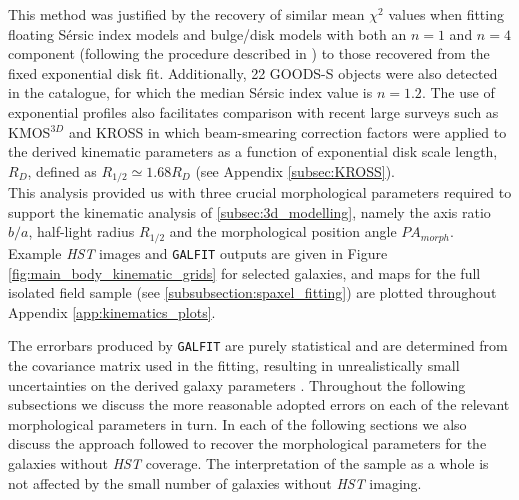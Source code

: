 \documentclass[fleqn,usenatbib]{mnras}
\newcommand{\Sers}{S\'{e}rsic }
\begin{document}
This method was justified by the recovery of similar mean $\chi^{2}$ values when fitting floating \Sers index models and bulge/disk models with both an $n=1$ and $n=4$ component (following the procedure described in \citealt{Bruce2012}) to those recovered from the fixed exponential disk fit.
Additionally, 22 GOODS-S objects were also detected in the \cite{VanderWel2012} catalogue, for which the median \Sers index value is $n=1.2$.
The use of exponential profiles also facilitates comparison with recent large surveys such as KMOS$^{3D}$ \citep{Wisnioski2015} and KROSS \citep{Harrison2017} in which beam-smearing correction factors were applied to the derived kinematic parameters as a function of exponential disk scale length, $R_{D}$, defined as $R_{1/2}\simeq1.68 R_{D}$ (see Appendix \ref{subsec:KROSS}). \\

\noindent
This analysis provided us with three crucial morphological parameters required to support the kinematic analysis of \cref{subsec:3d_modelling}, namely the axis ratio $b/a$, half-light radius $R_{1/2}$ and the morphological position angle $PA_{morph}$.
Example {\em HST} images and {\tt GALFIT} outputs are given in Figure \ref{fig:main_body_kinematic_grids} for selected galaxies, and maps for the full isolated field sample (see \cref{subsubsection:spaxel_fitting}) are plotted throughout Appendix \ref{app:kinematics_plots}. 

The errorbars produced by {\tt GALFIT} are purely statistical and are determined from the covariance matrix used in the fitting, resulting in unrealistically small uncertainties on the derived galaxy parameters \citep{Hausler2007,Bruce2012}.
Throughout the following subsections we discuss the more reasonable adopted errors on each of the relevant morphological parameters in turn.
In each of the following sections we also discuss the approach followed to recover the morphological parameters for the galaxies without {\em HST} coverage.
The interpretation of the sample as a whole is not affected by the small number of galaxies without {\em HST} imaging.
\end{document}
